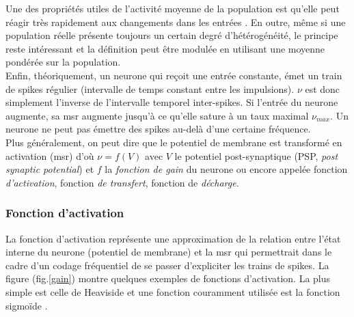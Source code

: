 Une des propriétés utiles de l'activité moyenne de la population est qu'elle peut réagir très rapidement aux changements dans les entrées \cite{Brunel:2001,Gerstner:2000}. En outre, même si une population réelle présente toujours un certain degré d'hétérogénéité, le principe reste intéressant et la définition peut être modulée en utilisant une moyenne pondérée sur la population. \\

Enfin, théoriquement, un neurone qui reçoit une entrée constante, émet un train de spikes régulier (intervalle de temps constant entre les impulsions). $\nu$ est donc simplement l'inverse de l'intervalle temporel inter-spikes. Si l'entrée du neurone augmente, sa \gls{msr} augmente jusqu'à ce qu'elle sature à un taux maximal $\nu_{max}$. Un neurone ne peut pas émettre des spikes au-delà d'une certaine fréquence.\\

Plus généralement, on peut dire que le potentiel de membrane est transformé en activation (\gls{msr}) d'o\`u $\nu = f(V)$ avec $V$ le potentiel post-synaptique (PSP, \textit{post synaptic potential}) et $f$ la \textit{fonction de gain} du neurone ou encore appelée fonction \textit{d'activation}, fonction \textit{de transfert}, fonction de \textit{décharge}.

\subsubsection{Fonction d'activation }

La fonction d'activation représente une approximation de la relation entre l'état interne du neurone (potentiel de membrane) et la \gls{msr} qui permettrait dans le cadre d'un codage fréquentiel de se passer d'expliciter les trains de spikes. La figure (fig.\ref{gain}) montre quelques exemples de fonctions d'activation. La plus simple est celle de Heaviside et une fonction couramment utilisée est la fonction sigmoïde \cite{Wilson:1972, Amari:1977}.\\


